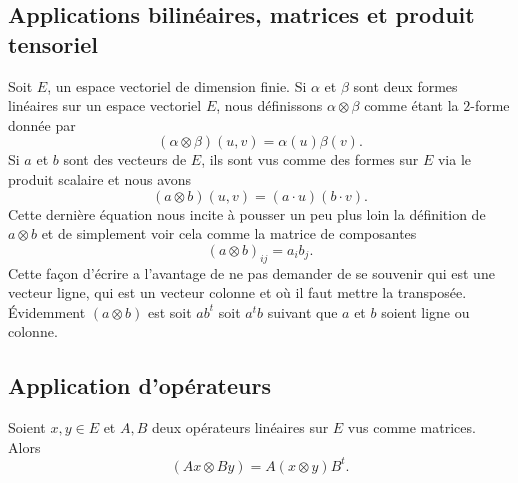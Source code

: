 \subsection{Applications bilinéaires, matrices et produit tensoriel}
\label{SECooUKRYooZjagcX}

Soit \( E\), un espace vectoriel de dimension finie. Si \( \alpha\) et \( \beta\) sont deux formes linéaires sur un espace vectoriel \( E\), nous définissons \( \alpha\otimes \beta\) comme étant la \( 2\)-forme donnée par
\begin{equation}        \label{EQooUNRYooKBrXyK}
    (\alpha\otimes \beta)(u,v)=\alpha(u)\beta(v).
\end{equation}
Si \( a\) et \( b\) sont des vecteurs de \( E\), ils sont vus comme des formes sur \( E\) via le produit scalaire et nous avons
\begin{equation}
    (a\otimes b)(u,v)=(a\cdot u)(b\cdot v).
\end{equation}
Cette dernière équation nous incite à pousser un peu plus loin la définition de \( a\otimes b\) et de simplement voir cela comme la matrice de composantes
\begin{equation}
    (a\otimes b)_{ij}=a_ib_j.
\end{equation}
Cette façon d'écrire a l'avantage de ne pas demander de se souvenir qui est une vecteur ligne, qui est un vecteur colonne et où il faut mettre la transposée. Évidemment \( (a\otimes b)\) est soit \( ab^t\) soit \( a^tb\) suivant que \( a\) et \( b\) soient ligne ou colonne.

\subsection{Application d'opérateurs}

\begin{lemma}   \label{LemMyKPzY}
    Soient \( x,y\in E\) et \( A,B\) deux opérateurs linéaires sur \( E\) vus comme matrices. Alors
    \begin{equation}        \label{EqXdxvSu}
        (Ax\otimes By)=A(x\otimes y)B^t.
    \end{equation}
\end{lemma}

